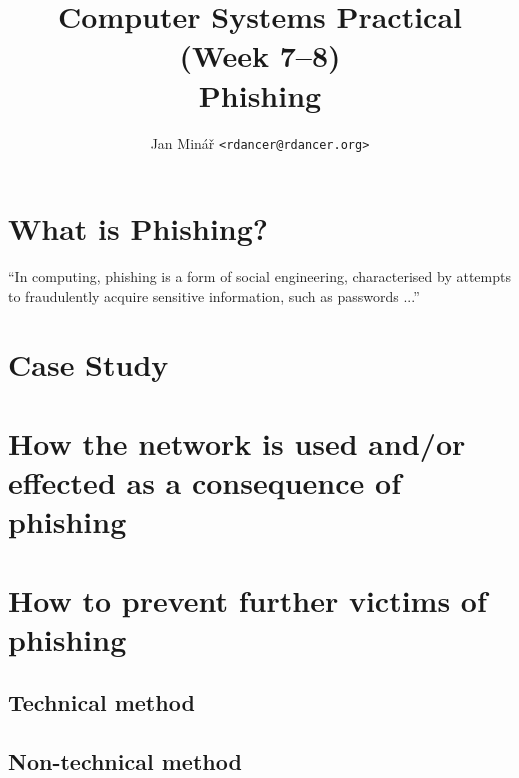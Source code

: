 \documentclass[10pt]{article}
\author{Jan Minář {\tt <rdancer@rdancer.org>}}
\title{Computer Systems Practical (Week 7--8)\\Phishing}
\begin{document}


\maketitle

%
%
%

%
%

\section{What is Phishing?}
``In computing, phishing is a form of social engineering, characterised by attempts to fraudulently acquire sensitive information, such as passwords ...'' \cite{gwavanation:phishing-definition}

%
%

\section{Case Study}

%
%

\section{How the network is used and/or effected as a consequence of phishing}

%
%

\section{How to prevent further victims of phishing}

%
%

\subsection{Technical method}

%
%

\subsection{Non-technical method}

%
%


\end{document}
